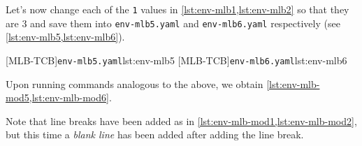   \begin{example}
  Let's now change each of the \texttt{1} values in \cref{lst:env-mlb1,lst:env-mlb2} so
  that they are $3$ and save them into \texttt{env-mlb5.yaml} and \texttt{env-mlb6.yaml}
  respectively (see \cref{lst:env-mlb5,lst:env-mlb6}). %

  \begin{cmhtcbraster}
   [MLB-TCB]{\texttt{env-mlb5.yaml}}{lst:env-mlb5}
   [MLB-TCB]{\texttt{env-mlb6.yaml}}{lst:env-mlb6}
  \end{cmhtcbraster}

  Upon running commands analogous to the above, we obtain
  \cref{lst:env-mlb-mod5,lst:env-mlb-mod6}.

  \begin{widepage}
   \begin{minipage}{.56\linewidth}
   \end{minipage}
   \hfill
   \begin{minipage}{.43\linewidth}
   \end{minipage}
  \end{widepage}

  Note that line breaks have been added as in \cref{lst:env-mlb-mod1,lst:env-mlb-mod2}, but
  this time a \emph{blank line} has been added after adding the line break.
  \end{example}

